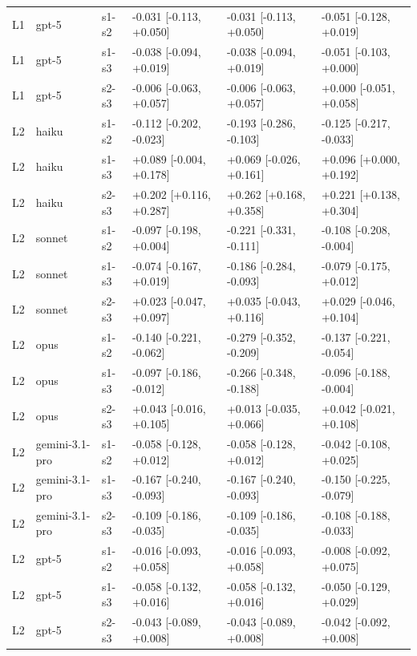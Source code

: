 \documentclass[10pt]{article} %
\begin{document}
\begin{table}[t]
\begin{center}
\begin{tabular}{llllll}
        L1 & gpt-5 & s1-s2 & -0.031 [-0.113, +0.050] & -0.031 [-0.113, +0.050] & -0.051 [-0.128, +0.019] \\
        L1 & gpt-5 & s1-s3 & -0.038 [-0.094, +0.019] & -0.038 [-0.094, +0.019] & -0.051 [-0.103, +0.000] \\
        L1 & gpt-5 & s2-s3 & -0.006 [-0.063, +0.057] & -0.006 [-0.063, +0.057] & +0.000 [-0.051, +0.058] \\
        L2 & haiku & s1-s2 & -0.112 [-0.202, -0.023] & -0.193 [-0.286, -0.103] & -0.125 [-0.217, -0.033] \\
        L2 & haiku & s1-s3 & +0.089 [-0.004, +0.178] & +0.069 [-0.026, +0.161] & +0.096 [+0.000, +0.192] \\
        L2 & haiku & s2-s3 & +0.202 [+0.116, +0.287] & +0.262 [+0.168, +0.358] & +0.221 [+0.138, +0.304] \\
        L2 & sonnet & s1-s2 & -0.097 [-0.198, +0.004] & -0.221 [-0.331, -0.111] & -0.108 [-0.208, -0.004] \\
        L2 & sonnet & s1-s3 & -0.074 [-0.167, +0.019] & -0.186 [-0.284, -0.093] & -0.079 [-0.175, +0.012] \\
        L2 & sonnet & s2-s3 & +0.023 [-0.047, +0.097] & +0.035 [-0.043, +0.116] & +0.029 [-0.046, +0.104] \\
        L2 & opus & s1-s2 & -0.140 [-0.221, -0.062] & -0.279 [-0.352, -0.209] & -0.137 [-0.221, -0.054] \\
        L2 & opus & s1-s3 & -0.097 [-0.186, -0.012] & -0.266 [-0.348, -0.188] & -0.096 [-0.188, -0.004] \\
        L2 & opus & s2-s3 & +0.043 [-0.016, +0.105] & +0.013 [-0.035, +0.066] & +0.042 [-0.021, +0.108] \\
        L2 & gemini-3.1-pro & s1-s2 & -0.058 [-0.128, +0.012] & -0.058 [-0.128, +0.012] & -0.042 [-0.108, +0.025] \\
        L2 & gemini-3.1-pro & s1-s3 & -0.167 [-0.240, -0.093] & -0.167 [-0.240, -0.093] & -0.150 [-0.225, -0.079] \\
        L2 & gemini-3.1-pro & s2-s3 & -0.109 [-0.186, -0.035] & -0.109 [-0.186, -0.035] & -0.108 [-0.188, -0.033] \\
        L2 & gpt-5 & s1-s2 & -0.016 [-0.093, +0.058] & -0.016 [-0.093, +0.058] & -0.008 [-0.092, +0.075] \\
        L2 & gpt-5 & s1-s3 & -0.058 [-0.132, +0.016] & -0.058 [-0.132, +0.016] & -0.050 [-0.129, +0.029] \\
        L2 & gpt-5 & s2-s3 & -0.043 [-0.089, +0.008] & -0.043 [-0.089, +0.008] & -0.042 [-0.092, +0.008] \\
    \end{tabular}
    \end{center}
    \end{table}
\end{document}
